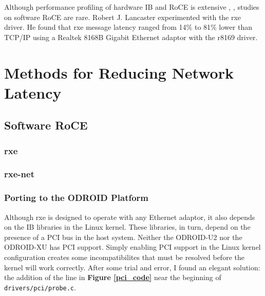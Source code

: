 \documentclass[a4paper]{article}
\begin{document}

Although performance profiling of hardware IB and RoCE is extensive
\cite{subamaroni-09}, \cite{vienne-12}, studies on software RoCE are
rare. Robert J. Lancaster \cite{lancaster-10} experimented with the rxe
driver. He found that rxe message latency ranged from 14\% to 81\% lower than
TCP/IP using a Realtek 8168B Gigabit Ethernet adaptor with the r8169 driver.


\newpage
\section{\textbf{Methods for Reducing Network Latency}}
\label{latency_reduction}

\subsection{\textbf{Software RoCE}}

\subsubsection{\textbf{rxe}}

\subsubsection{\textbf{rxe-net}}

\subsubsection{\textbf{Porting to the ODROID Platform}}


Although rxe is designed to operate with any Ethernet adaptor, it also depends
on the IB libraries in the Linux kernel. These libraries, in turn, depend on the
presence of a PCI bus in the host system. Neither the ODROID-U2 nor the
ODROID-XU has PCI support. Simply enabling PCI support in the Linux kernel
configuration creates some incompatibilites that must be resolved before the
kernel will work correctly. After some trial and error, I found an elegant
solution: the addition of the line in \textbf{Figure \ref{pci_code}} near the
beginning of \verb;drivers/pci/probe.c;.
\end{document}
